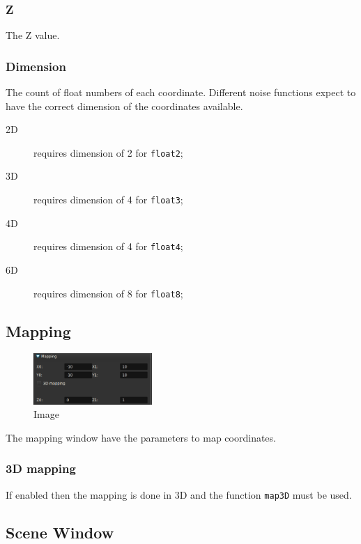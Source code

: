\subsubsection{Z}

The Z value.

\subsubsection{Dimension}

The count of float numbers of each coordinate. Different noise functions
expect to have the correct dimension of the coordinates available.

\begin{description}
\item[2D] requires dimension of 2 for \texttt{float2};
\item[3D] requires dimension of 4 for \texttt{float3};
\item[4D] requires dimension of 4 for \texttt{float4};
\item[6D] requires dimension of 8 for \texttt{float8};
\end{description}

\label{sec:mapping}\subsection{Mapping}

\begin{figure}[h]
\centering
\includegraphics[width=0.4\textwidth]{imgs/main-mapping-0.png}
\caption{Image}\label{fig:main-mapping-0}
\end{figure}

The mapping window have the parameters to map coordinates.

\subsubsection{3D mapping}

If enabled then the mapping is done in 3D and the function \texttt{map3D} must be used.

\subsection{Scene Window}

